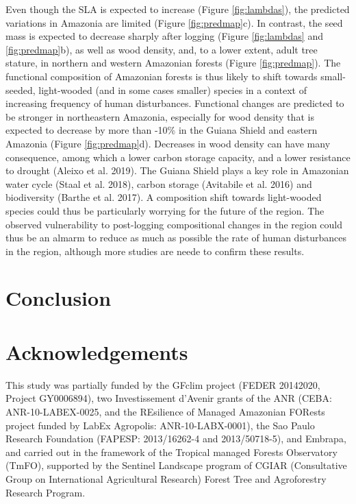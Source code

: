 \documentclass[]{elsarticle} %
\begin{document}
Even though the SLA is expected to increase (Figure \ref{fig:lambdas}),
the predicted variations in Amazonia are limited (Figure
\ref{fig:predmap}c). In contrast, the seed mass is expected to decrease
sharply after logging (Figure \ref{fig:lambdas} and \ref{fig:predmap}b),
as well as wood density, and, to a lower extent, adult tree stature, in
northern and western Amazonian forests (Figure \ref{fig:predmap}). The
functional composition of Amazonian forests is thus likely to shift
towards small-seeded, light-wooded (and in some cases smaller) species
in a context of increasing frequency of human disturbances. Functional
changes are predicted to be stronger in northeastern Amazonia,
especially for wood density that is expected to decrease by more than
-10\% in the Guiana Shield and eastern Amazonia (Figure
\ref{fig:predmap}d). Decreases in wood density can have many
consequence, among which a lower carbon storage capacity, and a lower
resistance to drought (Aleixo et al. 2019). The Guiana Shield plays a
key role in Amazonian water cycle (Staal et al. 2018), carbon storage
(Avitabile et al. 2016) and biodiversity (Barthe et al. 2017). A
composition shift towards light-wooded species could thus be
particularly worrying for the future of the region. The observed
vulnerability to post-logging compositional changes in the region could
thus be an almarm to reduce as much as possible the rate of human
disturbances in the region, although more studies are neede to confirm
these results.

\section{Conclusion}\label{conclusion}

\section{Acknowledgements}\label{acknowledgements}

This study was partially funded by the GFclim project (FEDER 20142020,
Project GY0006894), two Investissement d'Avenir grants of the ANR (CEBA:
ANR-10-LABEX-0025, and the REsilience of Managed Amazonian FORests
project funded by LabEx Agropolis: ANR-10-LABX-0001), the Sao Paulo
Research Foundation (FAPESP: 2013/16262-4 and 2013/50718-5), and
Embrapa, and carried out in the framework of the Tropical managed
Forests Observatory (TmFO), supported by the Sentinel Landscape program
of CGIAR (Consultative Group on International Agricultural Research)
Forest Tree and Agroforestry Research Program.
\end{document}

